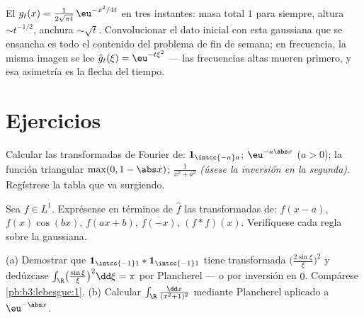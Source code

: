 \begin{omfigure}

{\small El  $g_t(x) =
\frac1{2\sqrt{\pi t}}\,\eu^{-x^2/4t}$ en tres instantes: masa total $1$
para siempre, altura $\sim t^{-1/2}$, anchura $\sim
\sqrt t$. Convolucionar el dato inicial con esta gaussiana que se
ensancha es todo el contenido del problema de fin de semana; en
frecuencia, la misma imagen se lee $\hat g_t(\xi) = \eu^{-t\xi^2}$ ---
las frecuencias altas mueren primero, y esa asimetría es la flecha del
tiempo.}
\end{omfigure}

\section{Ejercicios}

\begin{exercise}[$\star$]\label{exo:b3:fouriertransform:1}
Calcular las transformadas de Fourier de: $\mathbf 1_{\intcc{-a}a}$;
$\eu^{-a\abs x}$ ($a > 0$); la función triangular $\max(0, 1 -
\abs x)$; $\frac1{x^2 + a^2}$ \emph{(úsese la inversión en la segunda)}.
Regístrese la tabla que va surgiendo.
\end{exercise}

\begin{exercise}[$\star$]\label{exo:b3:fouriertransform:2}
Sea $f \in L^1$. Exprésense en términos de $\hat f$ las transformadas
de: $f(x - a)$, $f(x)\cos(bx)$, $f(ax + b)$, $\overline{f(-x)}$,
$(f * f)(x)$. Verifíquese cada regla sobre la gaussiana.
\end{exercise}

\begin{exercise}[$\star\star$]\label{exo:b3:fouriertransform:3}
(a) Demostrar que $\mathbf 1_{\intcc{-1}1} * \mathbf
1_{\intcc{-1}1}$ tiene transformada $\bigl(\frac{2\sin\xi}\xi
\bigr)^2$ y dedúzcase
$\int_\R\bigl(\frac{\sin\xi}\xi\bigr)^2\dd\xi = \pi$ por Plancherel ---
o por inversión en $0$. Compárese
\cref{pb:b3:lebesgue:1}.
(b) Calcular $\int_\R\frac{\dd x}{(x^2+1)^2}$ mediante Plancherel
aplicado a $\eu^{-\abs x}$.
\end{exercise}

